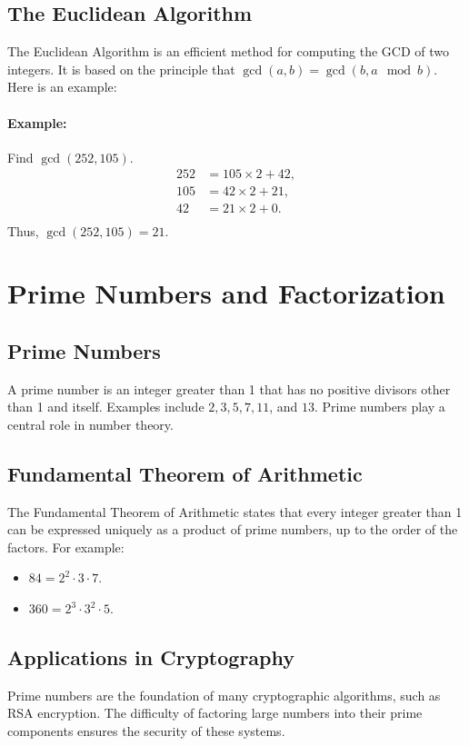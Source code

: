 \documentclass[12pt]{article}
\begin{document}
\subsection{The Euclidean Algorithm}
The Euclidean Algorithm is an efficient method for computing the GCD of two integers. It is based on the principle that $\gcd(a, b) = \gcd(b, a \mod b)$. Here is an example:

\paragraph{Example:} Find $\gcd(252, 105)$.
\begin{align*}
252 &= 105 \times 2 + 42, \\
105 &= 42 \times 2 + 21, \\
42 &= 21 \times 2 + 0. \\
\end{align*}
Thus, $\gcd(252, 105) = 21$.

\section{Prime Numbers and Factorization}

\subsection{Prime Numbers}
A prime number is an integer greater than 1 that has no positive divisors other than 1 and itself. Examples include $2, 3, 5, 7, 11$, and $13$. Prime numbers play a central role in number theory.

\subsection{Fundamental Theorem of Arithmetic}
The Fundamental Theorem of Arithmetic states that every integer greater than 1 can be expressed uniquely as a product of prime numbers, up to the order of the factors. For example:
\begin{itemize}
    \item $84 = 2^2 \cdot 3 \cdot 7$.
    \item $360 = 2^3 \cdot 3^2 \cdot 5$.
\end{itemize}

\subsection{Applications in Cryptography}
Prime numbers are the foundation of many cryptographic algorithms, such as RSA encryption. The difficulty of factoring large numbers into their prime components ensures the security of these systems.
\end{document}
